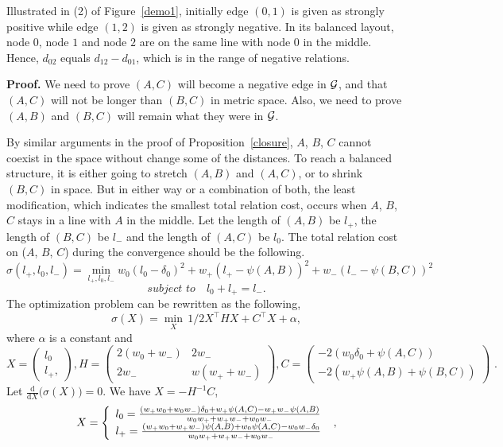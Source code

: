Illustrated in (2) of Figure~\ref{demo1}, initially edge $(0,1)$ is given as strongly positive while edge $(1,2)$ is given as strongly negative. In its balanced layout, node $0$, node $1$ and node $2$ are on the same line with node $0$ in the middle. Hence, $d_{02}$ equals $d_{12}-d_{01}$, which is in the range of negative relations. 

{\bf Proof.} We need to prove $(A,C)$ will become a negative edge in $\cal G$, and that $(A,C)$ will not be longer than $(B,C)$ in metric space. Also, we need to prove $(A,B)$ and $(B,C)$ will remain what they were in $\cal G$. 

By similar arguments in the proof of Proposition~\ref{closure}, $A$, $B$, $C$ cannot coexist in the space without change some of the distances. To reach a balanced structure, it is either going to stretch $(A,B)$ and $(A,C)$, or to shrink $(B,C)$ in space. But in either way or a combination of both, the least modification, which indicates the smallest total relation cost, occurs when $A$, $B$, $C$ stays in a line with $A$ in the middle. Let the length of $(A,B)$ be $l_{+}$, the length of $(B,C)$ be $l_{-}$ and the length of $(A,C)$ be $l_{0}$. The total relation cost on ($A$, $B$, $C$) during the convergence should be the following.
\[
\sigma(l_{+}, l_{0}, l_{-}) = \min_{l_{+}, l_{0}, l_{-}} w_{0}(l_{0}-\delta_{0})^2 + w_{+}(l_{+}-\psi(A,B))^2+w_{-}(l_{-}-\psi(B,C))^2
\]
\[
subject\,\,to  \quad l_{0}+l_{+}=l_{-}.
\]
The optimization problem can be rewritten as the following,
\[
\sigma(X)= \min_{X}\, 1/2X^{\top}HX+C^{\top}X+ \alpha,
\]
where $\alpha$ is a constant and
\[
 X =
 \begin{pmatrix}
  l_{0}  \\
  l_{+},
 \end{pmatrix},
  H =
 \begin{pmatrix}
  2(w_{0}+w_{-}) & 2w_{-}\\
  2w_{-} & w(w_{+}+w_{-})
 \end{pmatrix},
  C =
 \begin{pmatrix}
  -2(w_{0}\delta_{0}+\psi(A,C))  \\
  -2(w_{+}\psi(A,B)+\psi(B,C))
 \end{pmatrix}\text{ .}
\]
Let  $\frac{\mathrm d}{\mathrm d X} \big( \sigma(X) \big)=0$. We have $X=-H^{-1}C$, 
\[
  X=\left\{ 
  \begin{array}{l l}
    {l_{0}} = {{(w_{+}w_{0}+w_{0}w_{-})\delta_{0}+w_{+}\psi(A,C)-w_{+}w_{-}\psi(A,B)} \over {w_{0}w_{+}+w_{+}w_{-}+w_{0}w_{-}}}\\
    {l_{+}}={{(w_{+}w_{0}+w_{+}w_{-})\psi(A,B)+w_{0}\psi(A,C)-w_{0}w_{-}\delta_{0}} \over {w_{0}w_{+}+w_{+}w_{-}+w_{0}w_{-}}}
  \end{array} \right. \text{ ,}
\]
